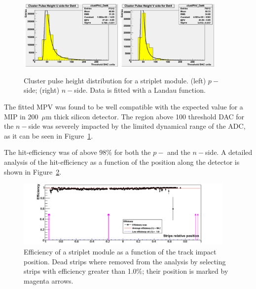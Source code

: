 \begin{figure}[!htpb]
\centering
\includegraphics[width=0.45\textwidth]{p_side_striplets.png}
\includegraphics[width=0.45\textwidth]{n_side_striplets.png}
\caption{\label{fig:clu_ph_striplets}Cluster pulse height distribution for a striplet module. (left) $p-$ side; 
(right) $n-$side. Data is fitted with a Landau function.}
\end{figure}

The fitted MPV was found to be well compatible with the expected  value for a MIP in 200~$\mu$m 
thick silicon detector. The region above 100 threshold DAC for the $n-$side was severely impacted 
by the limited dynamical range of the ADC, as it can be seen in Figure~\ref{fig:clu_ph_striplets}.

The hit-efficiency was of above 98\% for both the $p-$ and the $n-$side. A detailed analysis 
of the hit-efficiency as a function of the position along the detector is shown in 
Figure~\ref{fig:striplets_eff}.


\begin{figure}[!htpb]
\centering
\includegraphics[width=0.95\textwidth]{striplets_eff.png}
\caption{\label{fig:striplets_eff}Efficiency of a striplet module as a function of the track impact position. 
Dead strips where removed from the analysis by selecting strips with efficiency greater than 1.0\%; 
their position is marked by magenta arrows.}
\end{figure}

